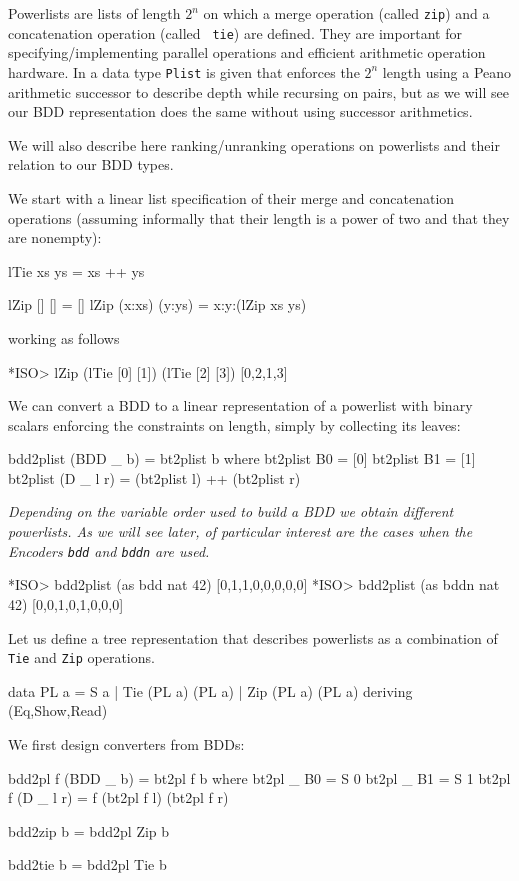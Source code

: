\documentclass[]{INCLUDES/llncs}
\begin{document}
Powerlists \cite{Misra94powerlist:a} are lists of length $2^n$ on which a
merge operation (called {\tt zip}) and a concatenation operation (called {\tt
tie}) are defined. They are important for specifying/implementing parallel 
operations and efficient arithmetic operation hardware. 
In \cite{Bird99programoptimisation} a data type {\tt Plist} is given that enforces
the $2^n$ length using a Peano arithmetic successor to describe depth while
recursing on pairs, but as we will see our BDD representation does the same
without using successor arithmetics.

We will also describe here ranking/unranking operations on powerlists and their
relation to our BDD types.

We start with a linear list specification of their merge and concatenation
operations (assuming informally that their length is a power of two
and that they are nonempty):
\begin{code}
lTie xs ys = xs ++ ys

lZip [] [] = []
lZip (x:xs) (y:ys) = x:y:(lZip xs ys)
\end{code}
working as follows
\begin{codex}
*ISO> lZip (lTie [0] [1]) (lTie [2] [3])
[0,2,1,3]
\end{codex}
We can convert a BDD to a linear representation of a powerlist with binary
scalars enforcing the constraints on length, simply by collecting its leaves:
\begin{code}
bdd2plist (BDD _ b) = bt2plist b where
  bt2plist B0 = [0]
  bt2plist B1 = [1]
  bt2plist (D _ l r) = (bt2plist l) ++ (bt2plist r)  
\end{code}
{\em
Depending on the variable order used to build a BDD we obtain different
powerlists. As we will see later, of particular interest are the cases when the
Encoders {\tt bdd} and {\tt bddn} are used.}
\begin{codex}
*ISO> bdd2plist (as bdd nat 42)
[0,1,1,0,0,0,0,0]
*ISO> bdd2plist (as bddn nat 42)
[0,0,1,0,1,0,0,0]
\end{codex}
Let us define a tree representation that describes powerlists as 
a combination of {\tt Tie} and {\tt Zip} operations.
\begin{code}
data PL a =  S a | Tie (PL a) (PL a) | Zip (PL a) (PL a) 
  deriving (Eq,Show,Read)
\end{code}
We first design converters from BDDs:
\begin{code}
bdd2pl f (BDD _ b) = bt2pl f b where
  bt2pl _ B0 = S 0
  bt2pl _ B1 = S 1
  bt2pl f (D _ l r) = f (bt2pl f l) (bt2pl f r)
  
bdd2zip b = bdd2pl Zip b

bdd2tie b = bdd2pl Tie b
\end{code}
\end{document}
